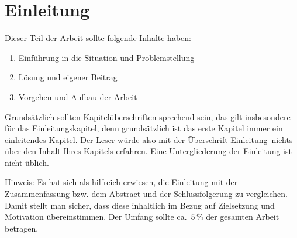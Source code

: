 \section{Einleitung} \label{einleitung}

Dieser Teil der Arbeit sollte folgende Inhalte haben:

\begin{enumerate}
	\item  Einführung in die Situation und Problemstellung
	\item  Lösung und eigener Beitrag
	\item  Vorgehen und Aufbau der Arbeit
\end{enumerate}

Grundsätzlich sollten Kapitelüberschriften sprechend sein, das gilt insbesondere für das Einleitungskapitel, denn grundsätzlich ist das erste Kapitel immer ein einleitendes Kapitel. Der Leser würde also mit der Überschrift \glqq Einleitung\grqq~nichts über den Inhalt Ihres Kapitels erfahren. Eine Untergliederung der Einleitung ist nicht üblich.

Hinweis:
Es hat sich als hilfreich erwiesen, die Einleitung mit der Zusammenfassung bzw. dem Abstract und der Schlussfolgerung zu vergleichen. Damit stellt man sicher, dass diese inhaltlich im Bezug auf Zielsetzung und Motivation übereinstimmen. Der Umfang sollte ca.~$5\,\%$ der gesamten Arbeit betragen.
